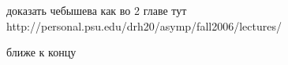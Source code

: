 \documentclass[12pt, a4paper, oneside]{article}
\begin{document}







доказать чебышева как во 2 главе тут  http://personal.psu.edu/drh20/asymp/fall2006/lectures/

ближе к концу
\end{document}
